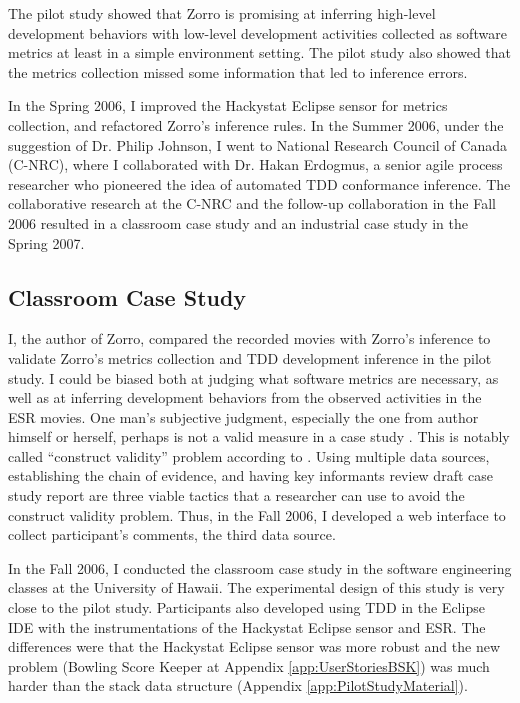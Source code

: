 The pilot study showed that Zorro is promising at inferring high-level development behaviors with low-level development activities collected as software metrics at least in a simple environment setting. The pilot study also showed that the metrics collection missed some information that led to inference errors. 

In the Spring 2006, I improved the Hackystat Eclipse sensor for metrics collection, and refactored Zorro's inference rules. In the Summer 2006, under the suggestion of Dr. Philip Johnson, I went to National Research Council of Canada (C-NRC), where I collaborated with Dr. Hakan Erdogmus, a senior agile process researcher who pioneered the idea of automated TDD conformance inference. The collaborative research at the C-NRC and the follow-up collaboration in the Fall 2006 resulted in a classroom case study and an industrial case study in the Spring 2007. 

\subsection{Classroom Case Study}
I, the author of Zorro, compared the recorded movies with Zorro's inference to validate Zorro's metrics collection and TDD development inference in the pilot study. I could be biased both at judging what software metrics are necessary, as well as at inferring development behaviors from the observed activities in the ESR movies. One man's subjective judgment, especially the one from author himself or herself, perhaps is not a valid measure in a case study \cite{Yin:03}. This is notably called ``construct validity'' problem according to \cite{Yin:03}. Using multiple data sources, establishing the chain of evidence, and having key informants review draft case study report are three viable tactics that a researcher can use to avoid the construct validity problem. Thus, in the Fall 2006, I developed a web interface to collect participant's comments, the third data source. 

In the Fall 2006, I conducted the classroom case study in the software engineering classes at the University of Hawaii. The  experimental design of this study is very close to the pilot study. Participants also developed using TDD in the Eclipse IDE with the instrumentations of the Hackystat Eclipse sensor and ESR. The differences were that the Hackystat Eclipse sensor was more robust and the new problem (Bowling Score Keeper at Appendix \ref{app:UserStoriesBSK}) was much harder than the stack data structure (Appendix \ref{app:PilotStudyMaterial}). 

